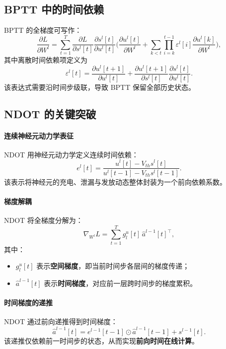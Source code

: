 \documentclass[journal,12pt,onecolumn]{IEEEtran}
\begin{document}
\subsection{BPTT 中的时间依赖}
BPTT 的全梯度可写作：
\begin{equation}
  \frac{\partial L}{\partial W^l} = \sum_{t=1}^T \frac{\partial L}{\partial s^l[t]} \frac{\partial s^l[t]}{\partial u^l[t]} \biggl(\frac{\partial u^l[t]}{\partial W^l} + \sum_{k<t}\prod_{i=k}^{t-1} \varepsilon^l[i] \frac{\partial u^l[k]}{\partial W^l}\biggr),
\end{equation}
其中离散时间依赖项定义为
\begin{equation}
  \varepsilon^l[t] = \frac{\partial u^l[t+1]}{\partial u^l[t]} + \frac{\partial u^l[t+1]}{\partial s^l[t]} \frac{\partial s^l[t]}{\partial u^l[t]}.
\end{equation}
该表达式需要沿时间步级联，导致 BPTT 保留全部历史状态。

\subsection{NDOT 的关键突破}
\paragraph{连续神经元动力学表征}
NDOT 用神经元动力学定义连续时间依赖：
\begin{equation}
  e^l[t] = \frac{u^l[t]-V_{th}s^l[t]}{u^l[t-1]-V_{th}s^l[t-1]}.
\end{equation}
该表示将神经元的充电、泄漏与发放动态整体封装为一个前向依赖系数。

\paragraph{梯度解耦}
NDOT 将全梯度分解为：
\begin{equation}
  \nabla_{W^l}L = \sum_{t=1}^T g^u_l[t] \, \hat{a}^{l-1}[t]^\top,
\end{equation}
其中：
\begin{itemize}[leftmargin=*]
  \item $g^u_l[t]$ 表示\textbf{空间梯度}，即当前时间步各层间的梯度传递；
  \item $\hat{a}^{l-1}[t]$ 表示\textbf{时间梯度}，对应前一层跨时间步的梯度累积。\end{itemize}

\paragraph{时间梯度的递推}
NDOT 通过前向递推得到时间梯度：
\begin{equation}
  \hat{a}^{l-1}[t] = e^{l-1}[t-1] \odot \hat{a}^{l-1}[t-1] + s^{l-1}[t].
\end{equation}
该递推仅依赖前一时间步的状态，从而实现\textbf{前向时间在线计算}。
\end{document}

